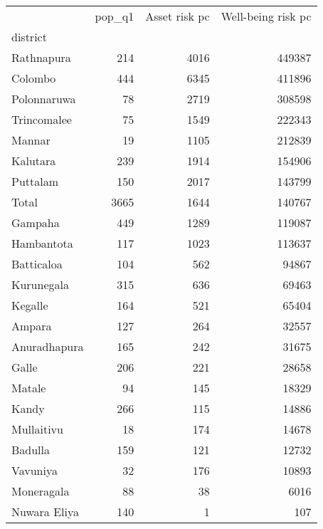 \begin{tabular}{lrrr}
\toprule
{} &  pop\_q1 &  Asset risk pc &  Well-being risk pc \\
district     &         &                &                     \\
\midrule
Rathnapura   &     214 &           4016 &              449387 \\
Colombo      &     444 &           6345 &              411896 \\
Polonnaruwa  &      78 &           2719 &              308598 \\
Trincomalee  &      75 &           1549 &              222343 \\
Mannar       &      19 &           1105 &              212839 \\
Kalutara     &     239 &           1914 &              154906 \\
Puttalam     &     150 &           2017 &              143799 \\
Total        &    3665 &           1644 &              140767 \\
Gampaha      &     449 &           1289 &              119087 \\
Hambantota   &     117 &           1023 &              113637 \\
Batticaloa   &     104 &            562 &               94867 \\
Kurunegala   &     315 &            636 &               69463 \\
Kegalle      &     164 &            521 &               65404 \\
Ampara       &     127 &            264 &               32557 \\
Anuradhapura &     165 &            242 &               31675 \\
Galle        &     206 &            221 &               28658 \\
Matale       &      94 &            145 &               18329 \\
Kandy        &     266 &            115 &               14886 \\
Mullaitivu   &      18 &            174 &               14678 \\
Badulla      &     159 &            121 &               12732 \\
Vavuniya     &      32 &            176 &               10893 \\
Moneragala   &      88 &             38 &                6016 \\
Nuwara Eliya &     140 &              1 &                 107 \\
\bottomrule
\end{tabular}
